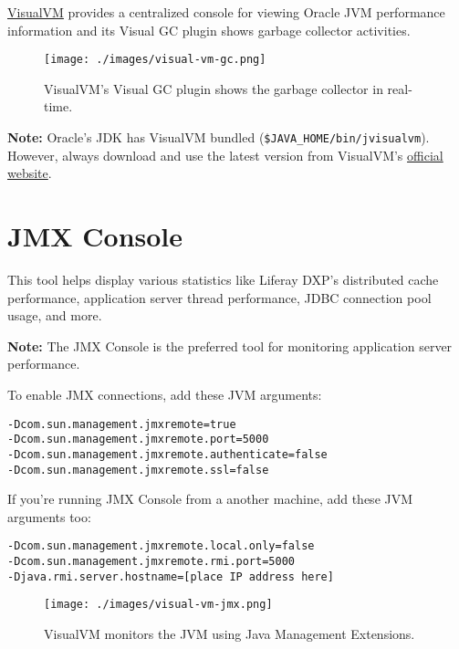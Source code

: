\href{https://visualvm.github.io/}{VisualVM} provides a centralized
console for viewing Oracle JVM performance information and its Visual GC
plugin shows garbage collector activities.

\begin{figure}
\centering
\texttt{[image: ./images/visual-vm-gc.png]}
\caption{VisualVM's Visual GC plugin shows the garbage collector in
real-time.}
\end{figure}

\noindent\hrulefill

\textbf{Note:} Oracle's JDK has VisualVM bundled
(\texttt{\$JAVA\_HOME/bin/jvisualvm}). However, always download and use
the latest version from VisualVM's
\href{https://visualvm.github.io/}{official website}.

\noindent\hrulefill

\section{JMX Console}\label{jmx-console}

This tool helps display various statistics like Liferay DXP's
distributed cache performance, application server thread performance,
JDBC connection pool usage, and more.

\noindent\hrulefill

\textbf{Note:} The JMX Console is the preferred tool for monitoring
application server performance.

\noindent\hrulefill

To enable JMX connections, add these JVM arguments:

\begin{verbatim}
-Dcom.sun.management.jmxremote=true
-Dcom.sun.management.jmxremote.port=5000
-Dcom.sun.management.jmxremote.authenticate=false
-Dcom.sun.management.jmxremote.ssl=false
\end{verbatim}

If you're running JMX Console from a another machine, add these JVM
arguments too:

\begin{verbatim}
-Dcom.sun.management.jmxremote.local.only=false
-Dcom.sun.management.jmxremote.rmi.port=5000
-Djava.rmi.server.hostname=[place IP address here]
\end{verbatim}

\begin{figure}
\centering
\texttt{[image: ./images/visual-vm-jmx.png]}
\caption{VisualVM monitors the JVM using Java Management Extensions.}
\end{figure}

